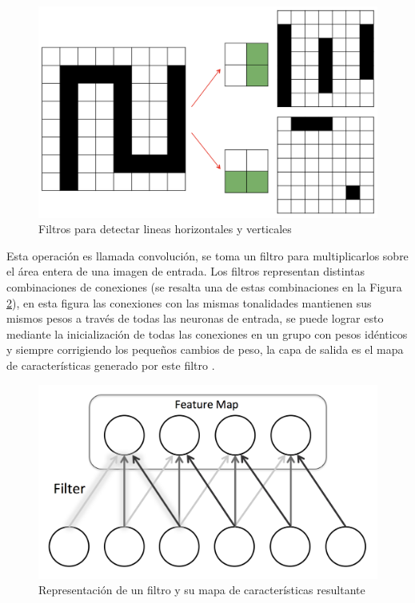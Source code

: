     \begin{figure}[htp]
        \centering
        \includegraphics[scale=0.4]{chapter3/image_two_filter.png}
        \caption{Filtros para detectar lineas horizontales y verticales}
        \label{fig:image_two_filter}
    \end{figure}

    Esta operación es llamada convolución, se toma un filtro para multiplicarlos sobre el área entera de una imagen de entrada. Los filtros representan distintas combinaciones de conexiones (se resalta una de estas combinaciones en la Figura \ref{fig:conv_neuron}), en esta figura las conexiones con las mismas tonalidades mantienen sus mismos pesos a través de todas las neuronas de entrada, se puede lograr esto mediante la inicialización de todas las conexiones en un grupo con pesos idénticos y siempre corrigiendo los pequeños cambios de peso, la capa de salida es el mapa de características generado por este filtro \cite{dlBook}.
    \begin{figure}[htp]
        \centering
        \includegraphics[scale=0.3]{chapter3/conv_neuron.png}
        \caption{Representación de un filtro y su mapa de características resultante}
        \label{fig:conv_neuron}
    \end{figure}

